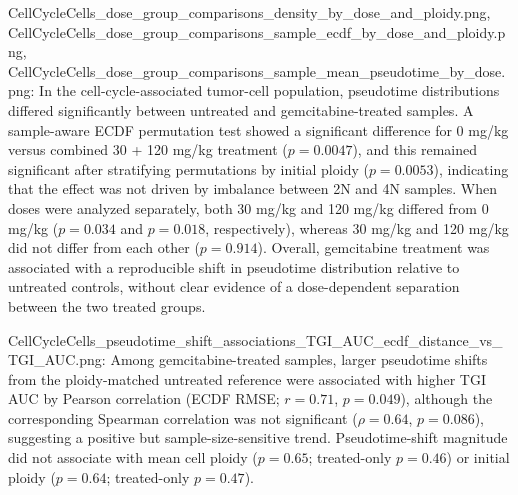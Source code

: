 CellCycleCells_dose_group_comparisons_density_by_dose_and_ploidy.png, CellCycleCells_dose_group_comparisons_sample_ecdf_by_dose_and_ploidy.png, CellCycleCells_dose_group_comparisons_sample_mean_pseudotime_by_dose.png: In the cell-cycle-associated tumor-cell population, pseudotime distributions differed significantly between untreated and gemcitabine-treated samples. A sample-aware ECDF permutation test showed a significant difference for 0 mg/kg versus combined 30 + 120 mg/kg treatment ($p = 0.0047$), and this remained significant after stratifying permutations by initial ploidy ($p = 0.0053$), indicating that the effect was not driven by imbalance between 2N and 4N samples. When doses were analyzed separately, both 30 mg/kg and 120 mg/kg differed from 0 mg/kg ($p = 0.034$ and $p = 0.018$, respectively), whereas 30 mg/kg and 120 mg/kg did not differ from each other ($p = 0.914$). Overall, gemcitabine treatment was associated with a reproducible shift in pseudotime distribution relative to untreated controls, without clear evidence of a dose-dependent separation between the two treated groups. 

CellCycleCells_pseudotime_shift_associations_TGI_AUC_ecdf_distance_vs_TGI_AUC.png: Among gemcitabine-treated samples, larger pseudotime shifts from the ploidy-matched untreated reference were associated with higher TGI AUC by Pearson correlation (ECDF RMSE; $r = 0.71$, $p = 0.049$), although the corresponding Spearman correlation was not significant ($\rho = 0.64$, $p = 0.086$), suggesting a positive but sample-size-sensitive trend. Pseudotime-shift magnitude did not associate with mean cell ploidy ($p = 0.65$; treated-only $p = 0.46$) or initial ploidy ($p = 0.64$; treated-only $p = 0.47$).
